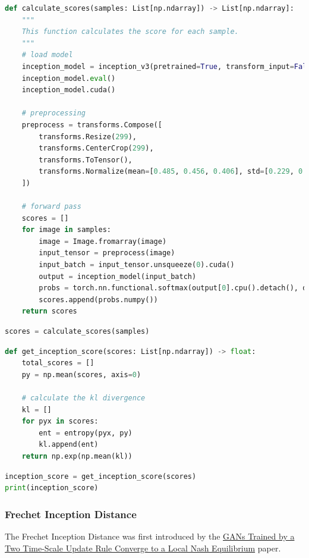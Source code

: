 \begin{lstlisting}[language=Python]
def calculate_scores(samples: List[np.ndarray]) -> List[np.ndarray]:
    """
    This function calculates the score for each sample.
    """
    # load model
    inception_model = inception_v3(pretrained=True, transform_input=False)
    inception_model.eval()
    inception_model.cuda()
    
    # preprocessing
    preprocess = transforms.Compose([
        transforms.Resize(299),
        transforms.CenterCrop(299),
        transforms.ToTensor(),
        transforms.Normalize(mean=[0.485, 0.456, 0.406], std=[0.229, 0.224, 0.225]),
    ])    
    
    # forward pass
    scores = []
    for image in samples:
        image = Image.fromarray(image)
        input_tensor = preprocess(image)
        input_batch = input_tensor.unsqueeze(0).cuda()
        output = inception_model(input_batch)
        probs = torch.nn.functional.softmax(output[0].cpu().detach(), dim=0)
        scores.append(probs.numpy())
    return scores
\end{lstlisting}

\begin{lstlisting}[language=Python]
scores = calculate_scores(samples)
\end{lstlisting}

\begin{lstlisting}[language=Python]
def get_inception_score(scores: List[np.ndarray]) -> float:
    total_scores = []
    py = np.mean(scores, axis=0)

    # calculate the kl divergence
    kl = []
    for pyx in scores:
        ent = entropy(pyx, py)
        kl.append(ent)
    return np.exp(np.mean(kl))
\end{lstlisting}

\begin{lstlisting}[language=Python]
inception_score = get_inception_score(scores)
print(inception_score)
\end{lstlisting}

\subsubsection{Frechet Inception Distance}

The Frechet Inception Distance was first introduced by the
\href{https://arxiv.org/pdf/1706.08500.pdf}{GANs Trained by a Two
Time-Scale Update Rule Converge to a Local Nash Equilibrium} paper. \newline

